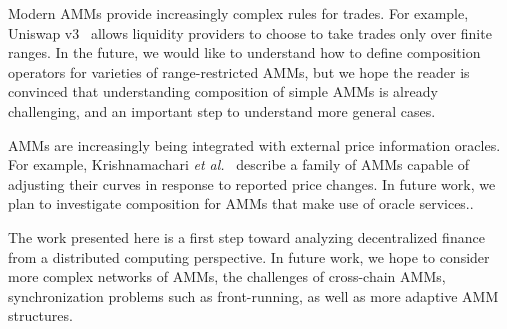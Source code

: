 Modern AMMs provide increasingly complex rules for trades.
For example, Uniswap v3~\cite{uniswapv3} allows liquidity providers to
choose to take trades only over finite ranges.
In the future,
we would like to understand how to define composition operators
for varieties of range-restricted AMMs,
but we hope the reader is convinced that understanding composition
of simple AMMs is already challenging,
and an important step to understand more general cases.

AMMs are increasingly being integrated with external price
information oracles.
For example,
Krishnamachari \emph{et al.}~\cite{krishnamachari2021dynamic}
describe a family of AMMs capable of adjusting their
curves in response to reported price changes.
In future work,
we plan to investigate composition for AMMs that make use of oracle services..

The work presented here is a first step toward analyzing
decentralized finance from a distributed computing perspective.
In future work,
we hope to consider more complex networks of AMMs,
the challenges of cross-chain AMMs,
synchronization problems such as front-running,
as well as more adaptive AMM structures.
